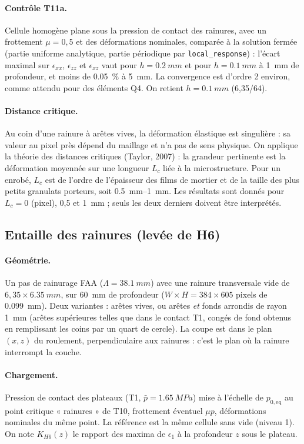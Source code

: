 \paragraph{Contrôle T11a.} Cellule homogène plane sous la pression de contact des rainures, avec
un frottement $\mu=0{,}5$ et des déformations nominales, comparée à la solution fermée (partie
uniforme analytique, partie périodique par \texttt{local\_response}) : l'écart maximal sur
$\epsilon_{xx}$, $\epsilon_{zz}$ et $\epsilon_{xz}$ vaut \NonzeAgros{} pour $h=\SI{0.2}{mm}$ et
\NonzeAfin{} pour $h=\SI{0.1}{mm}$ à \SI{1}{mm} de profondeur, et moins de
\SI{0.05}{\percent} à \SI{5}{mm}. La convergence est d'ordre 2 environ, comme attendu pour des
éléments Q4. On retient $h=\SI{0.1}{mm}$ (6,35/64).

\paragraph{Distance critique.} Au coin d'une rainure à arêtes vives, la déformation élastique est
singulière : sa valeur au pixel près dépend du maillage et n'a pas de sens physique. On applique
la théorie des distances critiques (Taylor, 2007) : la grandeur pertinente est la déformation
moyennée sur une longueur $L_c$ liée à la microstructure. Pour un enrobé, $L_c$ est de l'ordre de
l'épaisseur des films de mortier et de la taille des plus petits granulats porteurs, soit
\SIrange{0.5}{1}{mm}. Les résultats sont donnés pour $L_c=0$ (pixel), 0,5 et \SI{1}{mm} ; seuls
les deux derniers doivent être interprétés.

\subsection{Entaille des rainures (levée de H6)}\label{sec:n2_rain}
\paragraph{Géométrie.} Un pas de rainurage FAA ($\Lambda=\SI{38.1}{mm}$) avec une rainure
transversale vide de $6{,}35\times\SI{6.35}{mm}$, sur \SI{60}{mm} de profondeur ($W\times H =
384\times605$ pixels de \SI{0.099}{mm}). Deux variantes : arêtes vives, ou arêtes \emph{et} fonds
arrondis de rayon \SI{1}{mm} (arêtes supérieures telles que dans le contact T1, congés de fond
obtenus en remplissant les coins par un quart de cercle). La coupe est dans le plan $(x,z)$ du
roulement, perpendiculaire aux rainures : c'est le plan où la rainure interrompt la couche.
\paragraph{Chargement.} Pression de contact des plateaux (T1, $\bar p=\SI{1.65}{MPa}$) mise à
l'échelle de $p_{0,\text{eq}}$ au point critique « rainures » de T10, frottement éventuel
$\mu p$, déformations nominales du même point. La référence est la même cellule sans vide
(niveau 1). On note $K_{H6}(z)$ le rapport des maxima de $\epsilon_1$ à la profondeur $z$ sous le
plateau.

